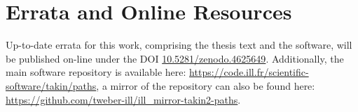 \chapter{Errata and Online Resources}
Up-to-date errata for this work, comprising the thesis text and the software, 
will be published on-line under the DOI \href{https://doi.org/10.5281/zenodo.4625649}{10.5281/zenodo.4625649}.
Additionally, the main software repository is available here: \url{https://code.ill.fr/scientific-software/takin/paths},
a mirror of the repository can also be found here: \url{https://github.com/tweber-ill/ill_mirror-takin2-paths}.
